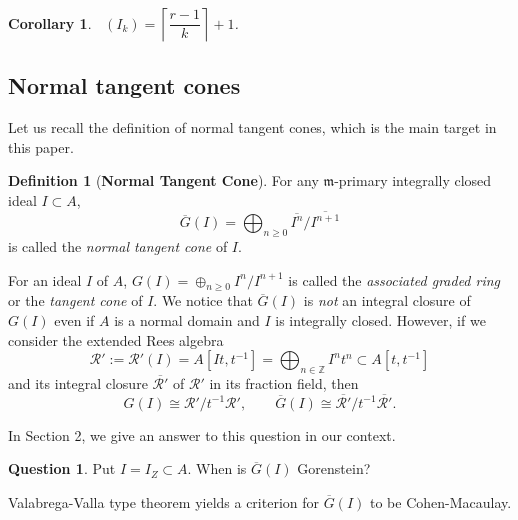 \documentclass[12pt]{amsart}
\newtheorem{cor}[thm]{Corollary}
\theoremstyle{definition}
\newtheorem{defn}[thm]{Definition}
\newtheorem{quest}[thm]{Question}
\theoremstyle{remark}
\numberwithin{equation}{section}
\DeclareMathOperator{\br}{\bar r}
\newcommand{\m}{\mathfrak m}
\renewcommand{\:}{\colon}
\begin{document}
\begin{cor}\label{br(Ik)} 
$\br(I_k) = \left\lceil \dfrac{r-1}{k} \right\rceil +1$.  
\end{cor} 



\par \vspace{3mm}
\subsection{Normal tangent cones}
Let us recall the definition of normal tangent cones, which is the main 
target in this paper. 

\begin{defn}[\textbf{Normal Tangent Cone}] \label{def:cones}
For any $\m$-primary integrally closed ideal $I \subset A$,  
\[
\overline{G}(I) = \bigoplus_{n \ge 0} \overline{I^n}/\overline{I^{n+1}}
\]
is called the {\it normal tangent cone} of $I$. 
\end{defn} 

\par \vspace{3mm}
For an ideal $I$ of $A$,    
$G(I) = \oplus_{n \ge 0} I^n/I^{n+1}$ 
is called the {\it associated graded ring} or the {\it tangent cone} of $I$. 
We notice that $\overline{G}(I)$ is \textit{not} an integral closure of $G(I)$ even if $A$ is a normal domain and $I$ is integrally closed.  
However, if we consider the extended Rees algebra 
\[
\mathcal{R}':=\mathcal{R}'(I)=  A[It, t^{-1}] = \bigoplus_{n \in \mathbb{Z}} I^n t^n \subset A[t,t^{-1}] 
\]
and its integral closure $\overline{\mathcal{R}'}$ of $\mathcal{R}'$ 
in its fraction field, then 
\[
G(I) \cong \mathcal{R}'/t^{-1}\mathcal{R}', \qquad 
\overline{G}(I) \cong \overline{\mathcal{R}'}/t^{-1} \overline{\mathcal{R}'}. 
\]

\par \vspace{3mm}
In Section 2, we give an answer to this question in our context. 

\begin{quest}
Put $I=I_Z \subset A$. When is $\overline{G}(I)$ Gorenstein?
\end{quest}

\par  \vspace{3mm}
Valabrega-Valla type theorem yields a criterion for $\overline{G}(I)$ 
to be Cohen-Macaulay. 
\end{document}
